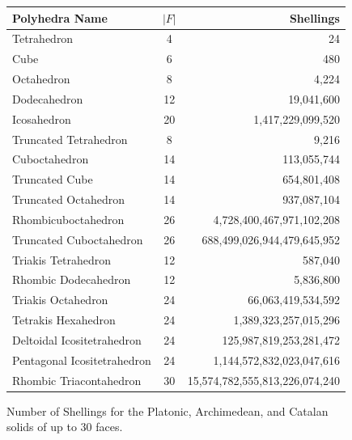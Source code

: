 \begin{figure}[ht]
\centering
\begin{tabular}{ l | c | r}
Polyhedra Name & $|F|$ & Shellings \\
  \hline    
Tetrahedron                     & 4  	& 24 \\                         
Cube                            & 6  	& 480 \\                        
Octahedron                      & 8  	& 4,224\\                       
Dodecahedron                    & 12 	& 19,041,600 \\                 
Icosahedron                     & 20 	& 1,417,229,099,520 \\ \hline   
Truncated Tetrahedron           & 8     & 9,216 \\                      
Cuboctahedron                   & 14	& 113,055,744 \\                
Truncated Cube                  & 14	& 654,801,408 \\                
Truncated Octahedron            & 14	& 937,087,104 \\                
Rhombicuboctahedron             & 26	& 4,728,400,467,971,102,208 \\  
Truncated Cuboctahedron         & 26	& 688,499,026,944,479,645,952 \\ \hline
Triakis Tetrahedron             & 12    & 587,040\\                     
Rhombic Dodecahedron            & 12 	& 5,836,800\\                   
Triakis Octahedron              & 24	& 66,063,419,534,592 \\         
Tetrakis Hexahedron             & 24	& 1,389,323,257,015,296 \\      
Deltoidal Icositetrahedron      & 24	& 125,987,819,253,281,472\\     
Pentagonal Icositetrahedron     & 24	& 1,144,572,832,023,047,616 \\  
Rhombic Triacontahedron         & 30	& 15,574,782,555,813,226,074,240 \\
\end{tabular}
\caption{Number of Shellings for the Platonic, Archimedean, and Catalan solids of up to 30 faces.}
\label{tab:Shellings}
\end{figure}


